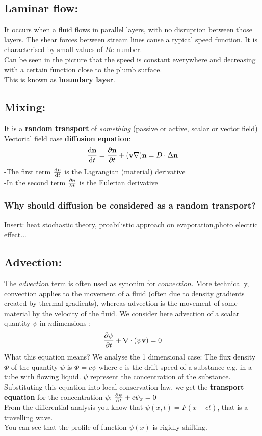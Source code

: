 \documentclass[a4paper,11pt]{article}
\begin{document}
\subsection{Laminar flow:}
 It occurs when a fluid flows in parallel layers, with no disruption between those layers.
 The shear forces between stream lines cause a typical speed function. 
 It is characterised by small values of $Re$ number.\\
Can be seen in the picture that the speed is constant everywhere and decreasing with a certain function close to the plumb surface. \\
 This is known as \textbf{boundary layer}.

\subsection{Mixing:}
It is a \textbf{random transport} of \emph{something} (passive or active, scalar or vector field) \\ %
Vectorial field case \textbf{diffusion equation}:
\[ \dv{\mathbf{n}}{t} =\pdv{\mathbf{n}}{t}+(\mathbf{v} \nabla)\mathbf{n} = D \cdot \Delta \mathbf{n} \]
-The first term $\dv{n}{t}$ is the Lagrangian (material) derivative \\
-In the second term $\pdv{n}{t}$ is the Eulerian derivative

\subsubsection{Why should diffusion be considered as a random transport?}
Insert: heat stochastic theory, proabilistic approach on evaporation,photo electric effect...


\subsection{Advection:}
The $advection$ term is often used as synonim for $convection$. More technically, convection applies to the movement of a fluid (often due to density gradients created by thermal gradients), whereas advection is the movement of some material by the velocity of the fluid.
We consider here advection of a scalar quantity $\psi$ in $n$dimensions :
\[   \pdv{\psi}{t}+\nabla \cdot (\psi \mathbf{v})=0   \]
What this equation means? We analyse the 1 dimensional case:
The flux density $\Phi$  of the quantity $\psi$ is $\Phi=c\psi$ where c is the drift speed of a substance e.g. in a tube with flowing liquid. $\psi$ represent the concentration of the substance. Substituting this equation into local conservation law, we get the \textbf{transport equation} for the concentration $\psi$:
$\pdv{\psi}{t}+c\psi_x=0$ \\
 From the differential analysis you know that $\psi(x,t)=F(x-ct)$, that is a travelling wave. \\
 You can see that the profile of function $\psi(x)$ is rigidly shifting.
 
\end{document}
